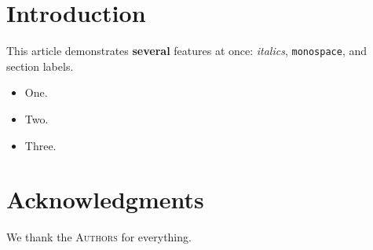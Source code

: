 \documentclass{article}
\begin{document}
\section{Introduction}
\label{sec:intro}

This article demonstrates \textbf{several} features at once: \emph{italics},
\texttt{monospace}, and section labels.

\begin{itemize}
\item One.
\item Two.
\item Three.
\end{itemize}

\section*{Acknowledgments}

We thank the \textsc{Authors} for everything.
\end{document}
